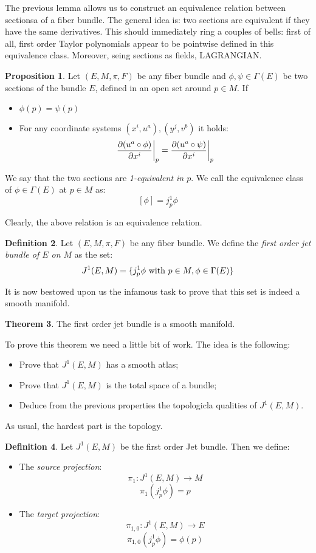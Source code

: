 \documentclass[12pt,a4paper]{report}
\theoremstyle{definition}
\newtheorem{Def}{Definition}[chapter]
\theoremstyle{Theorem}
\newtheorem{Theo}[Def]{Theorem}
\newtheorem{Prop}[Def]{Proposition}
\theoremstyle{definition}
\theoremstyle{definition}
\begin{document}
	The previous lemma allows us to construct an equivalence relation between sectionsa of a fiber bundle. The general idea is: two sections are equivalent if they have the same derivatives. This should immediately ring a couples of bells: first of all, first order Taylor polynomials appear to be pointwise defined in this equivalence class. Moreover, seing sections as fields, LAGRANGIAN.
	\begin{Prop}
		Let $(E,M,\pi,F)$ be any fiber bundle and $\phi,\psi\in\Gamma(E)$ be two sections of the bundle $E$, defined in an open set around $p\in M$. If
		\begin{itemize}
			\item $\phi(p)=\psi(p)$ 
			\item For any coordinate systems $(x^i,u^a),(y^j,v^b)$ it holds:
			$${\partial(u^a\circ\phi) \over \partial{x^i}}\bigg|_p={\partial(u^a\circ\psi) \over \partial{x^i}}\bigg|_p$$
		\end{itemize} 
		We say that the two sections are \textit{1-equivalent in $p$}. We call the equivalence class of $\phi\in\Gamma(E)$ at $p\in M$ as: $$[\phi]=j_p^1\phi$$
	\end{Prop}
	Clearly, the above relation is an equivalence relation.
	\begin{Def}
		Let $(E,M,\pi,F)$ be any fiber bundle. We define the \textit{first order jet bundle of $E$ on $M$} as the set:
		$$J^1(E,M)=\{j^1_p\phi \hbox{ with }p\in M, \phi\in\Gamma(E)\}$$
	\end{Def}
	It is now bestowed upon us the infamous task to prove that this set is indeed a smooth manifold.
	\begin{Theo}
		The first order jet bundle is a smooth manifold.
	\end{Theo}
	To prove this theorem we need a little bit of work. The idea is the following:
	\begin{itemize}
		\item Prove that $J^1(E,M)$ has a smooth atlas;
		\item Prove that $J^1(E,M)$ is the total space of a bundle;
		\item Deduce from the previous properties the topologicla qualities of $J^1(E,M)$. 
	\end{itemize}
	As usual, the hardest part is the topology.
	\begin{Def}
		Let $J^1(E,M)$ be the first order Jet bundle. Then we define:
		\begin{itemize}
			\item The \textit{source projection}:
			$$
				\pi_{1}:J^1(E,M)\longrightarrow M $$
				$$
				\pi_1(j^1_p\phi)=p$$	
			\item The \textit{target projection}:
			$$
			\pi_{1,0}:J^1(E,M)\longrightarrow E $$
			$$
			\pi_{1,0}(j^1_p\phi)=\phi(p)$$		
		\end{itemize}
	\end{Def}
\end{document}
